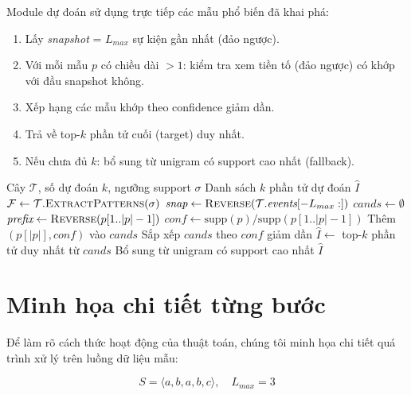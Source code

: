 \documentclass[a4paper,12pt]{report}
\begin{document}
Module dự đoán sử dụng trực tiếp các mẫu phổ biến đã khai phá:

\begin{enumerate}
    \item Lấy \textit{snapshot} = $L_{max}$ sự kiện gần nhất (đảo ngược).
    \item Với mỗi mẫu $p$ có chiều dài $> 1$: kiểm tra xem tiền tố (đảo ngược) có khớp với đầu snapshot không.
    \item Xếp hạng các mẫu khớp theo confidence giảm dần.
    \item Trả về top-$k$ phần tử cuối (target) duy nhất.
    \item Nếu chưa đủ $k$: bổ sung từ unigram có support cao nhất (fallback).
\end{enumerate}

\begin{algorithm}[H]
\caption{Dự đoán phần tử tiếp theo}
\label{alg:predict}
\begin{algorithmic}[1]
\REQUIRE Cây $\mathcal{T}$, số dự đoán $k$, ngưỡng support $\sigma$
\ENSURE Danh sách $k$ phần tử dự đoán $\hat{I}$
\STATE $\mathcal{F} \leftarrow \mathcal{T}.\textsc{ExtractPatterns}(\sigma)$
\STATE $\textit{snap} \leftarrow \textsc{Reverse}(\mathcal{T}.\textit{events}[-L_{max}:])$
\STATE $\textit{cands} \leftarrow \emptyset$
    \STATE $\textit{prefix} \leftarrow \textsc{Reverse}(p[1..|p|-1])$
        \STATE $\textit{conf} \leftarrow \text{supp}(p) / \text{supp}(p[1..|p|-1])$
        \STATE Thêm $(p[|p|], \textit{conf})$ vào $\textit{cands}$
    \ENDIF
\ENDFOR
\STATE Sắp xếp $\textit{cands}$ theo $\textit{conf}$ giảm dần
\STATE $\hat{I} \leftarrow$ top-$k$ phần tử duy nhất từ $\textit{cands}$
    \STATE Bổ sung từ unigram có support cao nhất 
\ENDIF
\RETURN $\hat{I}$
\end{algorithmic}
\end{algorithm}

\section{Minh họa chi tiết từng bước}
\label{sec:trace}

Để làm rõ cách thức hoạt động của thuật toán, chúng tôi minh họa chi tiết quá trình xử lý trên luồng dữ liệu mẫu:

$$S = \langle a, b, a, b, c \rangle, \quad L_{max} = 3$$
\end{document}
